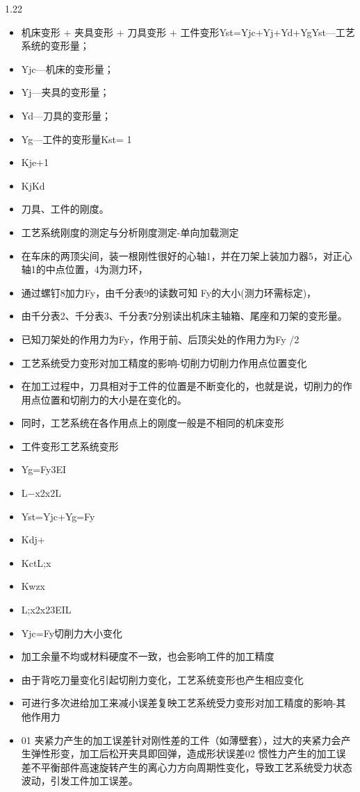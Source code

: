 \documentclass[12pt,a4paper]{article}
\begin{document}
\begin{spacing}{1.22}
\begin{itemize}[leftmargin=2.2em,label=--]
  \item 机床变形 + 夹具变形 + 刀具变形 + 工件变形Yst=Yjc+Yj+Yd+YgYst—工艺系统的变形量；
  \item Yjc—机床的变形量；
  \item Yj—夹具的变形量；
  \item Yd—刀具的变形量；
  \item Yg—工件的变形量Kst= 1
  \item Kje+1
  \item KjKd
  \item 刀具、工件的刚度。
  \item 工艺系统刚度的测定与分析刚度测定-单向加载测定
  \item 在车床的两顶尖间，装一根刚性很好的心轴1，并在刀架上装加力器5，对正心轴1的中点位置，4为测力环，
  \item 通过螺钉8加力Fy，由千分表9的读数可知 Fy的大小(测力环需标定)，
  \item 由千分表2、千分表3、千分表7分别读出机床主轴箱、尾座和刀架的变形量。
  \item 已知刀架处的作用力为Fy，作用于前、后顶尖处的作用力为Fy /2
  \item 工艺系统受力变形对加工精度的影响-切削力切削力作用点位置变化
  \item 在加工过程中，刀具相对于工件的位置是不断变化的，也就是说，切削力的作用点位置和切削力的大小是在变化的。
  \item 同时，工艺系统在各作用点上的刚度一般是不相同的机床变形
  \item 工件变形工艺系统变形
  \item Yg=Fy3EI
  \item L−x2x2L
  \item Yst=Yjc+Yg=Fy
  \item Kdj+
  \item KctL;x
  \item Kwzx
  \item L;x2x23EIL
  \item Yjc=Fy切削力大小变化
  \item 加工余量不均或材料硬度不一致，也会影响工件的加工精度
  \item 由于背吃刀量变化引起切削力变化，工艺系统变形也产生相应变化
  \item 可进行多次进给加工来减小误差复映工艺系统受力变形对加工精度的影响-其他作用力
  \item 01 夹紧力产生的加工误差针对刚性差的工件（如薄壁套），过大的夹紧力会产生弹性形变，加工后松开夹具即回弹，造成形状误差02 惯性力产生的加工误差不平衡部件高速旋转产生的离心力方向周期性变化，导致工艺系统受力状态波动，引发工件加工误差。

\end{itemize}
\end{spacing}
\end{document}
